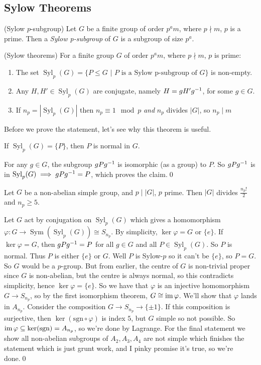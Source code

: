 \documentclass{article}
\DeclareMathOperator{\sym}{Sym}
\DeclareMathOperator{\syl}{Syl}
\begin{document}
\subsection{Sylow Theorems}
\begin{definition}
	(Sylow $ p $-subgroup) Let $ G $ be a finite group of order $ p^am$, where $ p\nmid m $, $ p $ is a prime. Then a \textit{Sylow p-subgroup} of $ G $ is a subgroup of size $ p^a $.
\end{definition}
\begin{theorem}
	(Sylow theorems) For a finite group $ G $ of order $ p^am $, where $ p\nmid m $, $ p $ is prime:
	\begin{enumerate}
		\item The set $ \syl_p(G)=\{P\le G$ $ |$ $P \text{ is a Sylow p-subgroup of } G \}$ is non-empty.
		\item Any $ H,H'\in \syl_p(G) $ are conjugate, namely $ H=gH'{g}^{-1} $, for some $ g\in G $.
		\item If $ n_p=|\syl_p(G)| $ then $ n_p\equiv 1 \mod p $ \textit{and} $ n_p $ divides $ |G| $, so $ n_p\mid m $
	\end{enumerate} 
\end{theorem}
Before we prove the statement, let's see why this theorem is useful.
\begin{lemma}
	If $ \syl_p(G)=\{P\} $, then $ P $ is normal in $ G $.
\end{lemma}
\pf For any $ g\in G $, the subgroup $ g P{g}^{-1} $ is isomorphic (as a group) to $ P $. So $ g P{g}^{-1} $ is in $ \syl_p(G) \implies gP\inv g=P$, which proves the claim.\qed
\begin{corollary}
	Let $ G $ be a non-abelian simple group, and $ p\mid |G| $, $ p $ prime. Then $ |G| $ divides $ \frac{n_p!}2 $ and $ n_p\ge 5 $.
\end{corollary}
Let $ G $ act by conjugation on $ \syl_p(G) $ which gives a homomorphism $ \varphi:G\to \sym(\syl_p(G))\cong S_{n_p} $. By simplicity, $ \ker \varphi=G $ or $ \{e\} $. If $ \ker \varphi=G $, then $ gP{g}^{-1}=P $ for all $ g\in G $ and all $ P\in\syl_p(G) $. So $ P $ is normal. Thus $ P $ is either $ \{e\} $ or $ G $. Well $ P$ is Sylow-$ p $ so it can't be $ \{e\} $, so $ P=G $. So $ G $ would be a $ p $-group. But from earlier, the centre of $ G $ is non-trivial proper since $ G $ is non-abelian, but the centre is always normal, so this contradicts simplicity, hence $ \ker \varphi=\{e\} $. So we have that $ \varphi $ is an injective homomorphism $ G\to S_{n_p} $, so by the first isomorphism theorem, $ G\cong \operatorname{im} \varphi $. We'll show that $ \varphi $ lands in $ A_{n_p} $. Consider the composition $ G\to S_{n_p}\to \{\pm 1\} $. If this composition is surjective, then $ \ker (\mathrm{sgn} \circ \varphi) $ is index $ 5 $, but $ G $ simple so not possible. So $ \operatorname{im}\varphi\subseteq \ker(\mathrm{sgn})=A_{n_p} $, so we're done by Lagrange. For the final statement we show all non-abelian subgroups of $ A_2, A_3, A_4 $ are not simple which finishes the statement which is just grunt work, and I pinky promise it's true, so we're done.\qed
\end{document}
